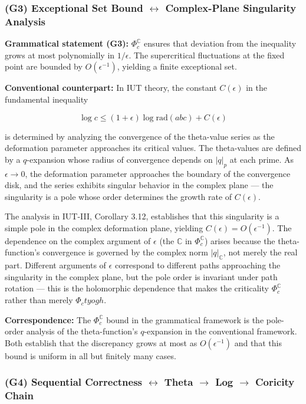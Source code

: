 \documentclass[12pt,a4paper]{article}
\begin{document}
\subsubsection{(G3) Exceptional Set Bound $\leftrightarrow$ Complex-Plane Singularity Analysis}

\textbf{Grammatical statement (G3):} $\Phi_c^\mathbb{C}$ ensures that deviation from the inequality grows at most polynomially in $1/\epsilon$. The supercritical fluctuations at the fixed point are bounded by $O(\epsilon^{-1})$, yielding a finite exceptional set.

\textbf{Conventional counterpart:} In IUT theory, the constant $C(\epsilon)$ in the fundamental inequality

\[\log c \leq (1 + \epsilon) \log \text{rad}(abc) + C(\epsilon)\]

is determined by analyzing the convergence of the theta-value series as the deformation parameter approaches its critical values. The theta-values are defined by a $q$-expansion whose radius of convergence depends on $|q|_p$ at each prime. As $\epsilon \to 0$, the deformation parameter approaches the boundary of the convergence disk, and the series exhibits singular behavior in the complex plane --- the singularity is a pole whose order determines the growth rate of $C(\epsilon)$.

The analysis in IUT-III, Corollary 3.12, establishes that this singularity is a simple pole in the complex deformation plane, yielding $C(\epsilon) = O(\epsilon^{-1})$. The dependence on the complex argument of $\epsilon$ (the $\mathbb{C}$ in $\Phi_c^\mathbb{C}$) arises because the theta-function's convergence is governed by the complex norm $|q|_\mathbb{C}$, not merely the real part. Different arguments of $\epsilon$ correspond to different paths approaching the singularity in the complex plane, but the pole order is invariant under path rotation --- this is the holomorphic dependence that makes the criticality $\Phi_c^\mathbb{C}$ rather than merely $\Phi_ctyogh$.

\textbf{Correspondence:} The $\Phi_c^\mathbb{C}$ bound in the grammatical framework is the pole-order analysis of the theta-function's $q$-expansion in the conventional framework. Both establish that the discrepancy grows at most as $O(\epsilon^{-1})$ and that this bound is uniform in all but finitely many cases.

\subsubsection{(G4) Sequential Correctness $\leftrightarrow$ Theta $\rightarrow$ Log $\rightarrow$ Coricity Chain}
\end{document}
